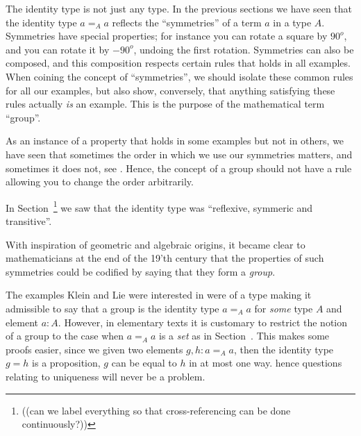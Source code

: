 The identity type is not just any type.  In the previous sections we have seen that the identity type $a=_Aa$ reflects the ``symmetries'' of a term $a$ in a type $A$.  Symmetries have special properties; for instance you can rotate a square by $90^o$, and you can rotate it by $-90^o$, undoing the first rotation.  
Symmetries can also be composed, and this composition respects certain rules that holds in all examples.  When coining the concept of ``symmetries'', we should isolate these common rules for all our examples, but also show, conversely, that anything satisfying these rules actually {\em is} an example.  This is the purpose of the mathematical term ``group''. 

As an instance of a property that holds in some examples but not in others, we have seen that sometimes the order in which we use our symmetries matters, and sometimes it does not, see .  Hence, the concept of a group should not have a rule allowing you to change the order arbitrarily.

In Section~ \footnote{((can we label everything so that cross-referencing can be done continuously?))} we saw that the identity type was ``reflexive, symmeric and transitive''.  

With inspiration of geometric and algebraic origins, it became clear to mathematicians at the end of the 19'th century that the properties of such symmetries could be codified by saying that they form a {\em group}. 

The examples Klein and Lie were interested in were of a type making it admissible to say that a group is the identity type $a=_Aa$ for {\em some} type $A$ and element $a:A$.  
However, in elementary texts it is customary to restrict the notion of a group to the case when $a=_Aa$ is a {\em set} as in Section~.  This makes some proofs easier, since we given two elements $g,h:a=_Aa$, then the identity type $g=h$ is a proposition, \ie $g$ can be equal to $h$ in at most one way.  hence questions relating to uniqueness will never be a problem.


